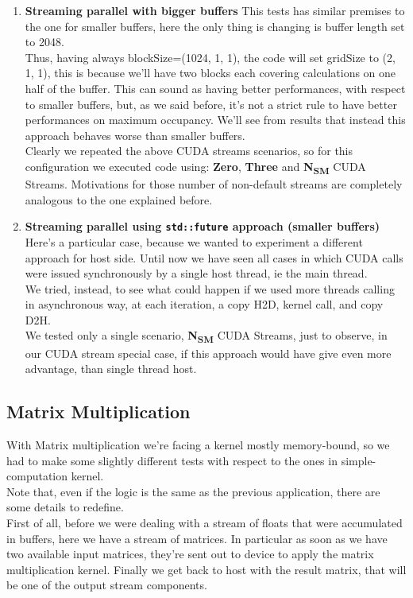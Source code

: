 \begin{enumerate}
	\item \textbf{Streaming parallel with bigger buffers}
	This tests has similar premises to the one for smaller buffers, here the only thing is changing is buffer length set to 2048.\\
	Thus, having always blockSize=(1024, 1, 1), the code will set gridSize to (2, 1, 1), this is because we'll have two blocks each covering calculations on one half of the buffer.
	This can sound as having better performances, with respect to smaller buffers, but, as we said before, it's not a strict rule to have better performances on maximum occupancy.
	We'll see from results that instead this approach behaves worse than smaller buffers. \\
	Clearly we repeated the above CUDA streams scenarios, so for this configuration we executed code using: \textbf{Zero}, \textbf{Three} and \textbf{N\textsubscript{SM}} CUDA Streams.
	Motivations for those number of non-default streams are completely analogous to the one explained before.

	\item \textbf{Streaming parallel using \texttt{std::future} approach (smaller buffers)}
	Here's a particular case, because we wanted to experiment a different approach for host side.
	Until now we have seen all cases in which CUDA calls were issued synchronously by a single host thread, ie the main thread.\\
	We tried, instead, to see what could happen if we used more threads calling in asynchronous way, at each iteration, a copy H2D, kernel call, and copy D2H.\\
	We tested only a single scenario, \textbf{N\textsubscript{SM}} CUDA Streams, just to observe, in our CUDA stream special case, if this approach would have give even more advantage, than single thread host.
	
\end{enumerate}

\subsection{Matrix Multiplication}
With Matrix multiplication we're facing a kernel mostly memory-bound, so we had to make some slightly different tests with respect to the ones in simple-computation kernel.\\
Note that, even if the logic is the same as the previous application, there are some details to redefine.\\
First of all, before we were dealing with a stream of floats that were accumulated in buffers, here we have a stream of matrices. In particular as soon as we have two available input matrices, they're sent out to device to apply the matrix multiplication kernel. Finally we get back to host with the result matrix, that will be one of the output stream components.

